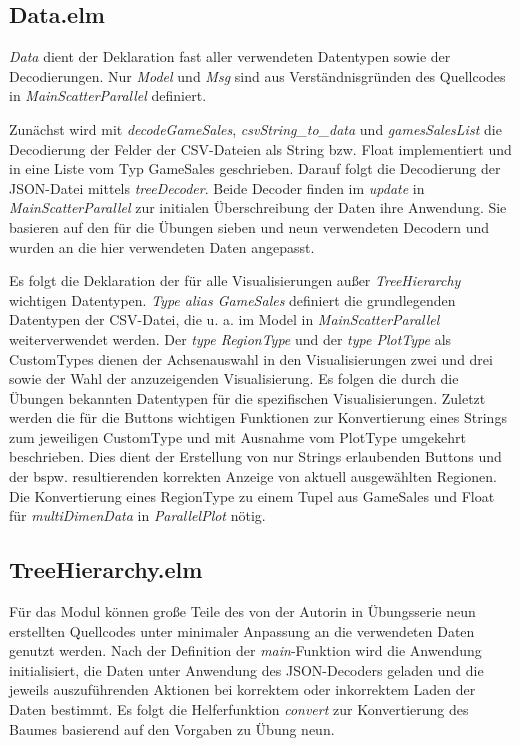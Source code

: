 \documentclass[usegeometry=true]{scrartcl}
\begin{document}
\subsection{Data.elm}
\textit{Data} dient der Deklaration fast aller verwendeten Datentypen sowie der Decodierungen. 
Nur \textit{Model} und \textit{Msg} sind aus Verständnisgründen des Quellcodes in \textit{MainScatterParallel} definiert. 

Zunächst wird mit \textit{decodeGameSales}, \textit{csvString\_to\_data} und \textit{gamesSalesList} die Decodierung der Felder der CSV-Dateien 
als String bzw. Float implementiert und in eine Liste vom Typ GameSales geschrieben. 
Darauf folgt die Decodierung der JSON-Datei mittels \textit{treeDecoder}.
Beide Decoder finden im \textit{update} in \textit{MainScatterParallel} zur initialen Überschreibung der Daten ihre Anwendung.
Sie basieren auf den für die Übungen sieben und neun verwendeten Decodern und wurden an die hier verwendeten Daten angepasst.

Es folgt die Deklaration der für alle Visualisierungen außer \textit{TreeHierarchy} wichtigen Datentypen.
\textit{Type alias GameSales} definiert die grundlegenden Datentypen der CSV-Datei, die u. a. im Model in \textit{MainScatterParallel} weiterverwendet werden. 
Der \textit{type RegionType} und der \textit{type PlotType} als CustomTypes dienen der Achsenauswahl in den Visualisierungen zwei und drei 
sowie der Wahl der anzuzeigenden Visualisierung. 
Es folgen die durch die Übungen bekannten Datentypen für die spezifischen Visualisierungen. 
Zuletzt werden die für die Buttons wichtigen Funktionen zur Konvertierung eines Strings zum jeweiligen CustomType 
und mit Ausnahme vom PlotType umgekehrt beschrieben. 
Dies dient der Erstellung von nur Strings erlaubenden Buttons und der bspw. resultierenden korrekten Anzeige von aktuell ausgewählten Regionen.
Die Konvertierung eines RegionType zu einem Tupel aus GameSales und Float für \textit{multiDimenData} in \textit{ParallelPlot} nötig.

\subsection{TreeHierarchy.elm}
Für das Modul können große Teile des von der Autorin in Übungsserie neun erstellten Quellcodes unter minimaler Anpassung an die verwendeten Daten genutzt werden.
Nach der Definition der \textit{main}-Funktion wird die Anwendung initialisiert, 
die Daten unter Anwendung des JSON-Decoders geladen und die jeweils auszuführenden Aktionen bei korrektem oder inkorrektem Laden der Daten bestimmt. 
Es folgt die Helferfunktion \textit{convert} zur Konvertierung des Baumes basierend auf den Vorgaben zu Übung neun.
\end{document}
